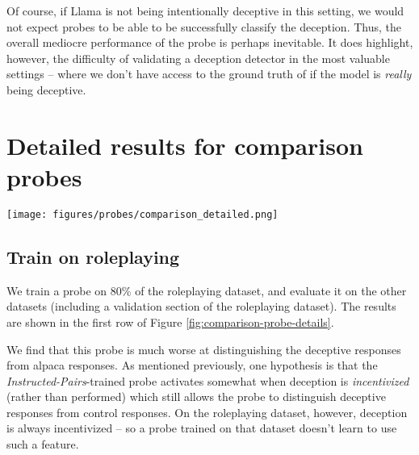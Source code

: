 \documentclass{article}
\begin{document}
Of course, if Llama is not being intentionally deceptive in this setting, we would not expect probes to be able to be successfully classify the deception. Thus, the overall mediocre performance of the probe is perhaps inevitable. It does highlight, however, the difficulty of validating a deception detector in the most valuable settings -- where we don't have access to the ground truth of if the model is \textit{really} being deceptive.

























\section{Detailed results for comparison probes}
\label{appx:detailed-comparison-results}

\begin{figure*}[h]
    \texttt{[image: figures/probes/comparison\_detailed.png]}
    \caption{Plots showing the performance of the four comparison probes described in section \ref{sec:comparison-probes}.}
    \label{fig:comparison-probe-details}
\end{figure*}

\subsection{Train on roleplaying}
\label{appx:roleplaying-probe-results}
We train a probe on 80\% of the roleplaying dataset, and evaluate it on
the other datasets (including a validation section of the roleplaying dataset).
The results are shown in the first row of Figure \ref{fig:comparison-probe-details}.


We find that this probe is much worse at distinguishing the deceptive
responses from alpaca responses. As mentioned previously, one hypothesis is that the \textit{Instructed-Pairs}-trained probe activates
somewhat when deception is \textit{incentivized} (rather than performed) which still allows the probe to
distinguish deceptive responses from control responses. On the
roleplaying dataset, however, deception is always incentivized -- so a
probe trained on that dataset doesn't learn to use such a feature.
\end{document}
